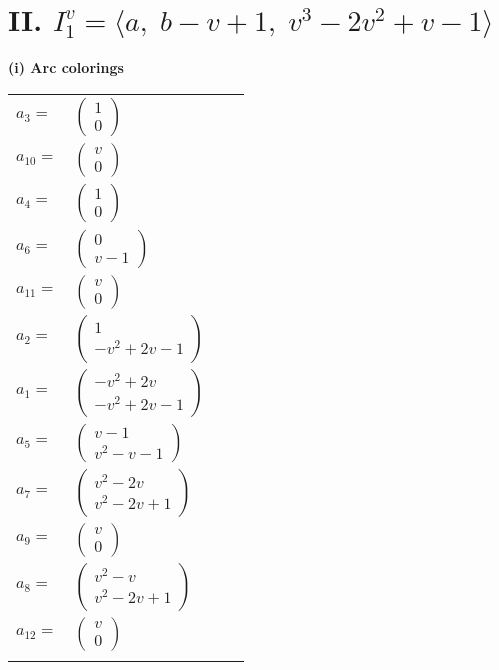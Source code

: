 \documentclass[1p]{elsarticle_modified}
\theoremstyle{definition}
\begin{document}
\centering \section*{II. $I^v_{1}= \langle a,\;b- v+1,\;v^3-2 v^2+v-1 \rangle$}
\flushleft \textbf{(i) Arc colorings}\\
\begin{tabular}{m{7pt} m{180pt} m{7pt} m{180pt} }
\flushright $a_{3}=$&$\begin{pmatrix}1\\0\end{pmatrix}$ \\
\flushright $a_{10}=$&$\begin{pmatrix}v\\0\end{pmatrix}$ \\
\flushright $a_{4}=$&$\begin{pmatrix}1\\0\end{pmatrix}$ \\
\flushright $a_{6}=$&$\begin{pmatrix}0\\v-1\end{pmatrix}$ \\
\flushright $a_{11}=$&$\begin{pmatrix}v\\0\end{pmatrix}$ \\
\flushright $a_{2}=$&$\begin{pmatrix}1\\- v^2+2 v-1\end{pmatrix}$ \\
\flushright $a_{1}=$&$\begin{pmatrix}- v^2+2 v\\- v^2+2 v-1\end{pmatrix}$ \\
\flushright $a_{5}=$&$\begin{pmatrix}v-1\\v^2- v-1\end{pmatrix}$ \\
\flushright $a_{7}=$&$\begin{pmatrix}v^2-2 v\\v^2-2 v+1\end{pmatrix}$ \\
\flushright $a_{9}=$&$\begin{pmatrix}v\\0\end{pmatrix}$ \\
\flushright $a_{8}=$&$\begin{pmatrix}v^2- v\\v^2-2 v+1\end{pmatrix}$ \\
\flushright $a_{12}=$&$\begin{pmatrix}v\\0\end{pmatrix}$\\&\end{tabular}
\end{document}
